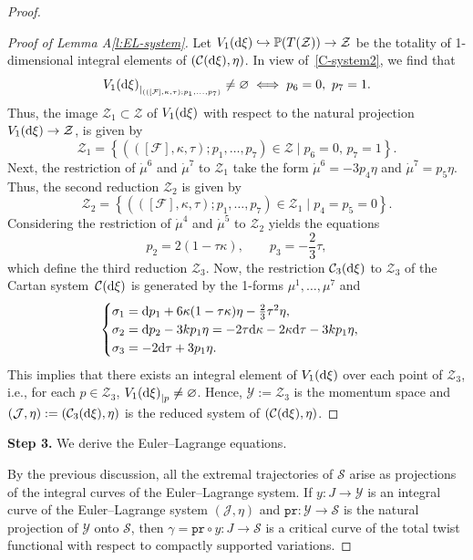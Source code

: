 \documentclass[pdftex]{sigma}
\numberwithin{equation}{section}
\def\S{\mathcal{S}}
\def\S{\mathcal{S}}
\begin{document}
\begin{proof}
\begin{proof}[Proof of Lemma A\ref{l:EL-system}]
Let $V_1({\rm d}\xi) \hookrightarrow \mathbb{P}(T(\mathcal{Z})) \to \mathcal{Z}$ be the totality of 1-dimensional integral elements of
$(\mathcal{C}({\rm d}\xi),\eta)$. In view of~\eqref{C-system2}, we find that
\[
{V_1({\rm d}\xi)}_{|_{(([\mathcal{F}], \kappa, \tau); p_1,\dots,p_7)}} \neq \varnothing \iff p_6 =0, \ p_7 =1.
\]
Thus,
the image $\mathcal{Z}_1 \subset \mathcal{Z}$
of $V_1({\rm d}\xi)$ with respect to the natural projection $V_1({\rm d}\xi) \to \mathcal{Z}$, is given by
\[
 \mathcal{Z}_1= \left\{ (([\mathcal{F}], \kappa, \tau); p_1,\dots,p_7) \in \mathcal{Z} \mid p_6 =0, \, p_7 =1 \right\}.
 \]
Next, the restriction of $\dot\mu^6$ and $\dot\mu^7$ to $\mathcal{Z}_1$ take the form $\dot\mu^6=-3p_4\eta$
and $\dot\mu^7=p_5\eta$.
Thus, the second
reduction
$ \mathcal{Z}_2$ is given by
\[
 \mathcal{Z}_2= \left\{ (([\mathcal{F}], \kappa, \tau); p_1,\dots,p_7) \in \mathcal{Z}_1 \mid p_4 = p_5 = 0 \right\}.
 \]
Considering the restriction of $\dot\mu^4$ and $\dot\mu^5$ to $\mathcal{Z}_2$ yields the equations
\[
 p_2=2(1-\tau\kappa), \qquad p_3 = -\frac23\tau  ,
\]
which define the third reduction
$\mathcal{Z}_3$. Now, the restriction $\mathcal{C}_3({\rm d}\xi)$ to
$\mathcal{Z}_3$ of the Cartan system~$\mathcal{C}({\rm d}\xi)$ is generated by the 1-forms $\mu^1, \dots, \mu^7$
and
\[
\begin{cases}
\sigma_1 = {\rm d}p_1 + 6 \kappa (1-\tau\kappa)\eta -\frac23 \tau^2\eta  ,\\
\sigma_2 = {\rm d}p_2 -3kp_1 \eta = -2\tau {\rm d}\kappa -2\kappa {\rm d}\tau -3kp_1 \eta ,\\
\sigma_3 = - 2{\rm d}\tau + 3 p_1 \eta .
\end{cases}
\]
This implies that there exists an integral element of $V_1({\rm d}\xi)$ over each point of $\mathcal{Z}_3$,
i.e., for each $p\in \mathcal{Z}_3$, ${V_1({\rm d}\xi)}_{|p} \neq \varnothing$. Hence, $\mathcal{Y} := \mathcal{Z}_3$
is the momentum space and $(\mathcal{J}, \eta) := (\mathcal{C}_3({\rm d}\xi), \eta)$ is the
reduced system of
$(\mathcal{C}({\rm d}\xi), \eta)$. \end{proof}

\textbf{Step 3.} We derive the Euler--Lagrange equations.

By the previous discussion, all the extremal trajectories of $\S$ arise as
projections of the
integral curves of the Euler--Lagrange system. If $y\colon J \to \mathcal{Y}$ is an integral curve
of the Euler--Lagrange system $(\mathcal{J}, \eta)$ and $\mathtt{pr}\colon \mathcal{Y} \to \S$
is the natural projection of $\mathcal{Y}$ onto $\S$, then $\gamma= \mathtt{pr}\circ y\colon J \to \S$
is a critical curve of the total twist functional with respect to compactly supported variations.


\end{proof}
\end{document}
